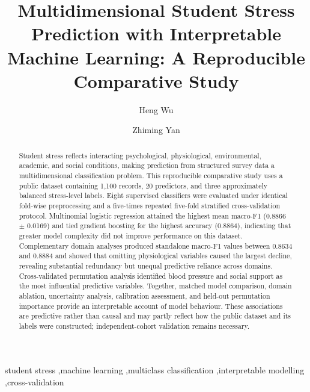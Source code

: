 \documentclass[review]{elsarticle}
\begin{document}
\begin{frontmatter}

\title{Multidimensional Student Stress Prediction with Interpretable Machine Learning: A Reproducible Comparative Study}

\author[a,b,c]{Heng Wu}
\author[a,c,d]{Zhiming Yan}
\address[a]{College of Education, Ludong University, Yantai 264025, China}
\address[b]{College of Information Engineering, Hangzhou Polytechnic College, Hangzhou 310018, China}
\address[c]{Institute of Network Technology Yantai, Yantai 264020, China}
\address[d]{College of Information Engineering, China Jiliang University, Hangzhou 310018, China}

\begin{abstract}
Student stress reflects interacting psychological, physiological, environmental, academic, and social conditions, making prediction from structured survey data a multidimensional classification problem. This reproducible comparative study uses a public dataset containing 1,100 records, 20 predictors, and three approximately balanced stress-level labels. Eight supervised classifiers were evaluated under identical fold-wise preprocessing and a five-times repeated five-fold stratified cross-validation protocol. Multinomial logistic regression attained the highest mean macro-F1 (0.8866 $\pm$ 0.0169) and tied gradient boosting for the highest accuracy (0.8864), indicating that greater model complexity did not improve performance on this dataset. Complementary domain analyses produced standalone macro-F1 values between 0.8634 and 0.8884 and showed that omitting physiological variables caused the largest decline, revealing substantial redundancy but unequal predictive reliance across domains. Cross-validated permutation analysis identified blood pressure and social support as the most influential predictive variables. Together, matched model comparison, domain ablation, uncertainty analysis, calibration assessment, and held-out permutation importance provide an interpretable account of model behaviour. These associations are predictive rather than causal and may partly reflect how the public dataset and its labels were constructed; independent-cohort validation remains necessary.
\end{abstract}

\begin{keyword}
student stress \sep machine learning \sep multiclass classification \sep interpretable modelling \sep cross-validation
\end{keyword}
\end{frontmatter}
\linenumbers
\end{document}
